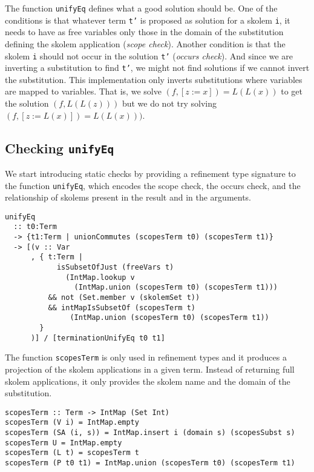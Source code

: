 \documentclass[sigconf, anonymous, review]{acmart}
\newcommand{\tc}[1]{{\small\texttt{#1}}}
\begin{document}
The function \tc{unifyEq} defines what a good solution should be.
One of the conditions is that whatever term \tc{t'} is proposed
as solution for a skolem \tc{i}, it needs to have as free variables only those in the
domain of the substitution defining the skolem application
(\textit{scope check}). Another
condition is that the skolem \tc{i} should not occur in the solution
\tc{t'} (\textit{occurs check}). And since we are inverting a substitution to find
\tc{t'}, we might not find solutions if we cannot invert the
substitution. This implementation only inverts substitutions where
variables are mapped to variables. That is, we solve $(f, [z:=x]) = L(L(x))$
to get the solution $(f, L(L(z)))$ but we do not try solving $(f, [z:=L(x)]) = L(L(x)))$.

\subsection{Checking \tc{unifyEq}}

We start introducing static checks by providing a refinement type signature to
the function \tc{unifyEq}, which encodes the scope check, the occurs check,
and the relationship of skolems present in the result and in the arguments.

\begin{verbatim}
unifyEq
  :: t0:Term
  -> {t1:Term | unionCommutes (scopesTerm t0) (scopesTerm t1)}
  -> [(v :: Var
      , { t:Term |
            isSubsetOfJust (freeVars t)
              (IntMap.lookup v
                (IntMap.union (scopesTerm t0) (scopesTerm t1)))
          && not (Set.member v (skolemSet t))
          && intMapIsSubsetOf (scopesTerm t)
               (IntMap.union (scopesTerm t0) (scopesTerm t1))
        }
      )] / [terminationUnifyEq t0 t1]
\end{verbatim}

The function \tc{scopesTerm} is only used in refinement types and it produces
a projection of the skolem applications in a given term. Instead of returning
full skolem applications, it only provides the skolem name and the domain of
the substitution.

\begin{verbatim}
scopesTerm :: Term -> IntMap (Set Int)
scopesTerm (V i) = IntMap.empty
scopesTerm (SA (i, s)) = IntMap.insert i (domain s) (scopesSubst s)
scopesTerm U = IntMap.empty
scopesTerm (L t) = scopesTerm t
scopesTerm (P t0 t1) = IntMap.union (scopesTerm t0) (scopesTerm t1)
\end{verbatim}
\end{document}
